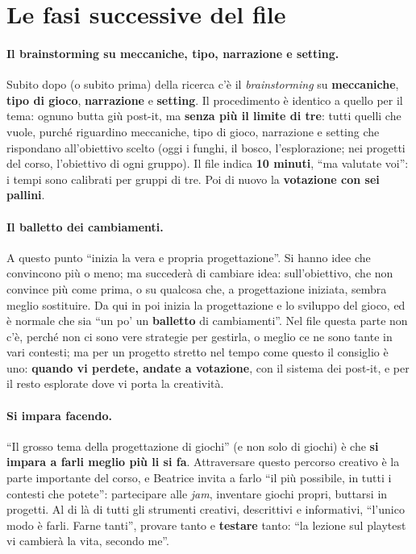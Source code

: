 \section{Le fasi successive del file}
\label{a7:sec:successive}

\paragraph{Il brainstorming su meccaniche, tipo, narrazione e setting.} Subito dopo
(o subito prima) della ricerca c'è il \emph{brainstorming} su \textbf{meccaniche},
\textbf{tipo di gioco}, \textbf{narrazione} e \textbf{setting}. Il procedimento è
identico a quello per il tema: ognuno butta giù post-it, ma \textbf{senza più il
limite di tre}: tutti quelli che vuole, purché riguardino meccaniche, tipo di gioco,
narrazione e setting che rispondano all'obiettivo scelto (oggi i funghi, il bosco,
l'esplorazione; nei progetti del corso, l'obiettivo di ogni gruppo). Il file indica
\textbf{10 minuti}, ``ma valutate voi'': i tempi sono calibrati per gruppi di tre.
Poi di nuovo la \textbf{votazione con sei pallini}.

\paragraph{Il balletto dei cambiamenti.} A questo punto ``inizia la vera e propria
progettazione''. Si hanno idee che convincono più o meno; ma succederà di cambiare
idea: sull'obiettivo, che non convince più come prima, o su qualcosa che, a
progettazione iniziata, sembra meglio sostituire. Da qui in poi inizia la
progettazione e lo sviluppo del gioco, ed è normale che sia ``un po' un
\textbf{balletto} di cambiamenti''. Nel file questa parte non c'è, perché non ci sono
vere strategie per gestirla, o meglio ce ne sono tante in vari contesti; ma per un
progetto stretto nel tempo come questo il consiglio è uno: \textbf{quando vi perdete,
andate a votazione}, con il sistema dei post-it, e per il resto esplorate dove vi
porta la creatività.

\paragraph{Si impara facendo.} ``Il grosso tema della progettazione di giochi'' (e
non solo di giochi) è che \textbf{si impara a farli meglio più li si fa}.
Attraversare questo percorso creativo è la parte importante del corso, e Beatrice
invita a farlo ``il più possibile, in tutti i contesti che potete'': partecipare alle
\emph{jam}, inventare giochi propri, buttarsi in progetti. Al di là di tutti gli
strumenti creativi, descrittivi e informativi, ``l'unico modo è farli. Farne tanti'',
provare tanto e \textbf{testare} tanto: ``la lezione sul playtest vi cambierà la vita,
secondo me''.

